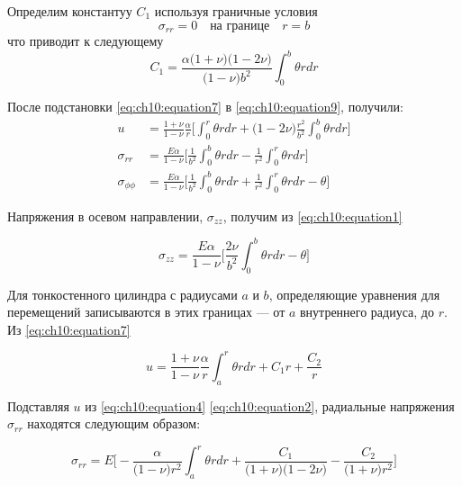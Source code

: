 Определим константуу \(C_1\) используя граничные условия
\begin{equation}
	\label{eq:ch10:equation10}
	\sigma_{rr} = 0 \quad \text{на границе} \quad r=b
\end{equation}
что приводит к следующему
\begin{equation}
	\label{eq:ch10:equation11}
	C_1 = \frac{\alpha \big(1+\nu\big) \big(1-2\nu\big)}{\big(1-\nu\big) b^2} \int_0^b \theta rdr
\end{equation}

После подстановки \cref{eq:ch10:equation7} в \cref{eq:ch10:equation9}, получили:
\begin{equation}
	\label{eq:ch10:equation12}
	\begin{split}
		u &= \frac{1+\nu}{1-\nu} \frac{\alpha}{r} \big[ \int_0^r \theta rdr +\big(1-2\nu\big ) \frac{r^2}{b^2}\int_0^b \theta r dr\big]\\
		\sigma_{rr} &= \frac{E \alpha}{1-\nu}\big[ \frac{1}{b^2}\int_0^b \theta rdr -\frac{1}{r^2}\int_0^r \theta r dr\big]\\
		\sigma_{\phi\phi} &= \frac{E \alpha}{1-\nu}\big[ \frac{1}{b^2}\int_0^b \theta rdr +\frac{1}{r^2}\int_0^r \theta r dr - \theta \big]
	\end{split}
\end{equation}

Напряжения в осевом направлении, \(\sigma_{zz}\), получим из \cref{eq:ch10:equation1}

\begin{equation}
	\label{eq:ch10:equation13}
	\sigma_{zz} = \frac{E \alpha}{1-\nu}\big[ \frac{2\nu}{b^2}\int_0^b \theta rdr  - \theta \big]
\end{equation}	
	
Для тонкостенного цилиндра с радиусами \(a\) и \(b\), определяющие уравнения для перемещений записываются в этих границах --- от \(a\) внутреннего радиуса, до \(r\). Из \cref{eq:ch10:equation7}

\begin{equation}
	\label{eq:ch10:equation14}
	u = \frac{1+\nu}{1-\nu} \frac{\alpha}{r} \int_a^r \theta rdr +C_1r +\frac{C_2}{r}
\end{equation}

Подставляя \(u\) из \cref{eq:ch10:equation4} \cref{eq:ch10:equation2}, радиальные напряжения \(\sigma_{rr}\) находятся следующим образом:

\begin{equation}
	\label{eq:ch10:equation15}
	\sigma_{rr} = E \big [-\frac{\alpha}{\big(1-\nu \big) r^2} \int_a^r \theta rdr + \frac{C_1}{\big (1+\nu\big ) \big(1-2\nu \big)} - \frac{C_2}{\big(1+\nu\big) r^2} \big]
\end{equation}


